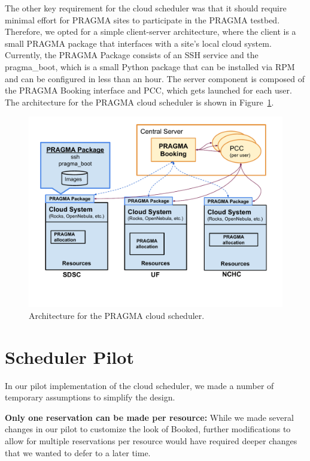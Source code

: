 \documentclass{acm_proc_article-sp}
\begin{document}
The other key requirement for the cloud scheduler was that it should require minimal effort for PRAGMA sites to participate in the PRAGMA testbed.  Therefore, we opted for a simple client-server architecture, where the client is a small PRAGMA package that interfaces with a site's local cloud system.  Currently, the PRAGMA Package consists of an SSH service and the pragma\_boot, which is a small Python package that can be installed via RPM and can be configured in less than an hour.  The server component is composed of the PRAGMA Booking interface and PCC, which gets launched for each user.  The architecture for the PRAGMA cloud scheduler is shown in Figure~\ref{Fig:Arch}.

\begin{figure}[htbp]
\begin{center}
\includegraphics[width=\columnwidth]{figures/arch.pdf}
\caption{Architecture for the PRAGMA cloud scheduler.}
\label{Fig:Arch}
\end{center}
\end{figure}

\section{Scheduler Pilot}
\label{Sec:Pilot}

In our pilot implementation of the cloud scheduler, we made a number of temporary assumptions to simplify the design.

\textbf{Only one reservation can be made per resource:}  While we made several changes in our pilot to customize the look of Booked, further modifications to allow for multiple reservations per resource would have required deeper changes that we wanted to defer to a later time.   
\end{document}
